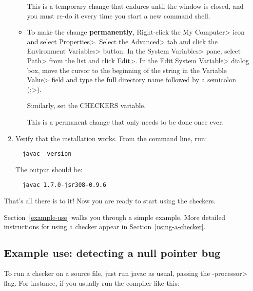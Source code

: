 \begin{enumerate}
\begin{itemize}
This is a temporary change that endures until the window is closed, and you
must re-do it every time you start a new command shell.

\item
To make the change \textbf{permanently},
Right-click the \<My Computer> icon and
select \<Properties>. Select the \<Advanced> tab and click the
\<Environment Variables> button. In the \<System Variables> pane, select
\<Path> from the list and click \<Edit>. In the \<Edit System Variable>
dialog box, move the cursor to the beginning of the string in the
\<Variable Value> field and type the full directory name followed by a
semicolon (\<;>).

Similarly, set the CHECKERS variable.

This is a permanent change that only needs to be done once ever.
\end{itemize}



\item
  Verify that the installation works.  From the command line, run:

\begin{Verbatim}
  javac -version
\end{Verbatim}

The output should be:

\begin{Verbatim}
  javac 1.7.0-jsr308-0.9.6
\end{Verbatim}

\end{enumerate}

That's all there is to it!  Now you are ready to start using the checkers.

Section~\ref{example-use} walks you through a simple example.  More detailed
instructions for using a checker appear in Section~\ref{using-a-checker}.



\subsection{Example use:  detecting a null pointer bug\label{example-use}}

To run a checker on a source file, just run javac as usual, passing the
\<-processor> flag.  For instance, if you usually run the compiler like
this:

